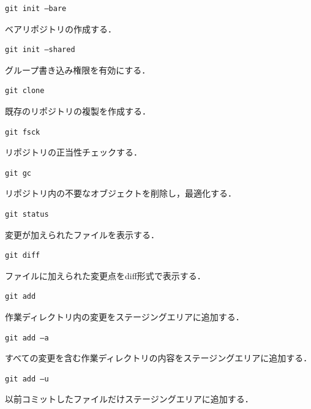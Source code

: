 \begin{lstlisting}[basicstyle=\ttfamily\footnotesize, frame=single]
git init –bare
\end{lstlisting}
ベアリポジトリの作成する．

\begin{lstlisting}[basicstyle=\ttfamily\footnotesize, frame=single]
git init –shared
\end{lstlisting}
グループ書き込み権限を有効にする．

\hfil
\begin{lstlisting}[basicstyle=\ttfamily\footnotesize, frame=single]
git clone	
\end{lstlisting}
既存のリポジトリの複製を作成する．

\hfil
\begin{lstlisting}[basicstyle=\ttfamily\footnotesize, frame=single]
git fsck
\end{lstlisting}
リポジトリの正当性チェックする．

\hfil
\begin{lstlisting}[basicstyle=\ttfamily\footnotesize, frame=single]
git gc
\end{lstlisting}
リポジトリ内の不要なオブジェクトを削除し，最適化する．

\hfil
\begin{lstlisting}[basicstyle=\ttfamily\footnotesize, frame=single]
git status
\end{lstlisting}
変更が加えられたファイルを表示する．

\hfil
\begin{lstlisting}[basicstyle=\ttfamily\footnotesize, frame=single]
git diff
\end{lstlisting}
ファイルに加えられた変更点をdiff形式で表示する．

\newpage

\begin{lstlisting}[basicstyle=\ttfamily\footnotesize, frame=single]
git add
\end{lstlisting}
作業ディレクトリ内の変更をステージングエリアに追加する．

\begin{lstlisting}[basicstyle=\ttfamily\footnotesize, frame=single]
git add –a
\end{lstlisting}
すべての変更を含む作業ディレクトリの内容をステージングエリアに追加する．

\begin{lstlisting}[basicstyle=\ttfamily\footnotesize, frame=single]
git add –u
\end{lstlisting}
以前コミットしたファイルだけステージングエリアに追加する．

